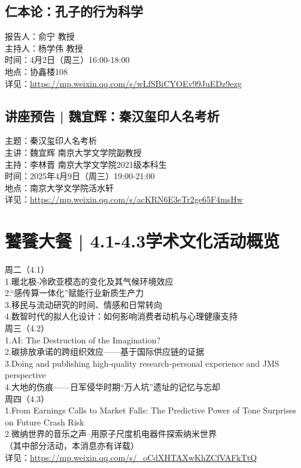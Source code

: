\documentclass[letterpaper, 12pt]{article}
\begin{document}
\begin{multicols}{2}
\subsection{仁本论：孔子的行为科学}
报告人：俞宁 教授
\\主持人：杨学伟 教授
\\时间：4月2日（周三）16:00-18:00
\\地点：协鑫楼108
\\详见：\url{https://mp.weixin.qq.com/s/wLfSBiCYOEv99JuEDz9ezg}
\subsection{讲座预告 | 魏宜辉：秦汉玺印人名考析}
主题：秦汉玺印人名考析
\\主讲：魏宜辉 南京大学文学院副教授
\\主持：李林晋 南京大学文学院2021级本科生
\\时间：2025年4月9日（周三）19:00‐21:00
\\地点：南京大学文学院活水轩
\\详见：\url{https://mp.weixin.qq.com/s/acKRN6E3eTr2ge65F4msHw}
\section{饕餮大餐 | 4.1-4.3学术文化活动概览}
周二（4.1）
\\1.暖北极-冷欧亚模态的变化及其气候环境效应
\\2.“感传算一体化”赋能行业新质生产力
\\3.移民与流动研究的时间、情感和日常转向
\\4.数智时代的拟人化设计：如何影响消费者动机与心理健康支持
\\周三（4.2）
\\1.AI: The Destruction of the Imagination?
\\2.碳排放承诺的跨组织效应——基于国际供应链的证据
\\3.Doing and publishing high-quality research-personal experience and JMS perspective
\\4.大地的伤痕——日军侵华时期“万人坑”遗址的记忆与忘却
\\周四（4.3）
\\1.From Earnings Calls to Market Falls: The Predictive Power of Tone Surprises on Future Crash Risk
\\2.微纳世界的音乐之声–用原子尺度机电器件探索纳米世界
\\（其中部分活动，本消息亦有详载）
\\详见：\url{https://mp.weixin.qq.com/s/_oCdXHTAXwKhZCfVAFkTtQ}



\end{multicols}
\end{document}
